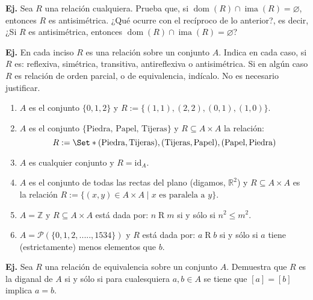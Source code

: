 \documentclass[letterpaper,DIV=14,headsepline,12pt]{scrartcl}
\providecommand\st{\;|\;}
\newcounter{Ejer}
\newcommand{\pts}{}
\newenvironment{ejercicio}[1]{\noindent
    \ifthenelse{\equal{#1}{1}}{\renewcommand{\pts}{\textbf{(#1 pt)}}}{\renewcommand{\pts}{\textbf{(#1 pts)}}}\textbf{Ej. \theEjer} \pts\stepcounter{Ejer}}{\vspace{.3cm}}
\newcommand{\id}{\mathrm{id}}
\renewcommand{\emptyset}{\varnothing}
\DeclareMathOperator{\ima}{ima}
\DeclareMathOperator{\dom}{dom}
\begin{document}
    \begin{ejercicio}{1}
        Sea $R$ una relación cualquiera. Prueba que, si $\dom(R) \cap \ima(R) = \emptyset$, entonces $R$ es antisimétrica. ¿Qué ocurre con el recíproco de lo anterior?, es decir, ¿Si $R$ es antisimétrica, entonces $\dom(R) \cap \ima(R) = \emptyset$?
    \end{ejercicio}

    \begin{ejercicio}{1}
        En cada inciso $R$ es una relación sobre un conjunto $A$. Indica en cada caso, si $R$ es: reflexiva, simétrica, transitiva, antireflexiva o antisimétrica. Si en algún caso $R$ es relación de orden parcial, o de equivalencia, indícalo. No es necesario justificar.
        \begin{enumerate}
            \item $A$ es el conjunto $\{0,1,2\}$ y $R:=\{(1,1),(2,2),(0,1),(1,0)\}$.

            \item $A$ es el conjunto $\{\text{Piedra, Papel, Tijeras}\}$ y $R \subseteq A \times A$ la relación:
            \[ R := \Set*{(\text{Piedra}, \text{Tijeras}), (\text{Tijeras}, \text{Papel}), (\text{Papel}, \text{Piedra})} \]

            \item $A$ es cualquier conjunto y $R=\id_A$.

            \item $A$ es el conjunto de todas las rectas del plano (digamos, $\mathbb{R}^2$) y $R \subseteq A \times A$ es la relación $R:=\{(x,y) \in A \times A \st x \text{ es paralela a } y\}$.
            
            \item $A=\mathbb{Z}$ y $R \subseteq A \times A$ está dada por: $n \mathrel{R} m$ si y sólo si $n ^2 \leq m^2$.

            \item $A=\mathscr{P}(\{0,1,2,.....,1534\})$ y $R$ está dada por: $a \mathrel{R} b$ si y sólo si $a$ tiene (estrictamente) menos elementos que $b$.
        \end{enumerate}
    \end{ejercicio}

    \begin{ejercicio}{1}
        Sea $R$ una relación de equivalencia sobre un conjunto $A$. Demuestra que $R$ es la diganal de $A$ si y sólo si para cualesquiera $a,b \in A$ se tiene que $[a]=[b]$ implica $a=b$.
    \end{ejercicio}
\end{document}

